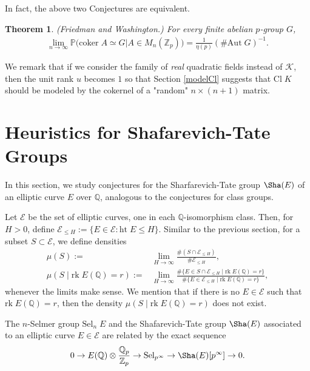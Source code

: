 \documentclass[12pt,reqno]{amsart}
\newtheorem{thm}{Theorem}[section]
\numberwithin{equation}{section}
\def\Z{{\mathbb Z}}
\def\Q{{\mathbb Q}}
\def\P{{\mathbb P}}
\def\sK{{\mathscr K}}
\def\sE{{\mathscr E}}
\begin{document}
In fact, the above two Conjectures are equivalent.

\begin{thm}{\rm (Friedman and Washington.)} For every finite abelian $p$-group $G$,
\begin{align*}
\lim_{n \to \infty} \P\big( \text{coker} \; A \simeq G | A \in M_n(\Z_p)\big) = \frac{1}{\eta(p)} (\# \text{Aut} \; G)^{-1}.
\end{align*}
\end{thm}

We remark that if we consider the family of \textit{real} quadratic fields instead of $\sK$, then the unit rank $u$ becomes $1$ so that Section \ref{modelCl} suggests that $\text{Cl} \; K$ should be modeled by the cokernel of a "random" $n \times (n+1)$ matrix.

\section{Heuristics for Shafarevich-Tate Groups}

In this section, we study conjectures for the Sharfarevich-Tate group $\Sha(E)$ of an elliptic curve $E$ over $\Q$, analogous to the conjectures for class groups.

Let $\sE$ be the set of elliptic curves, one in each $\Q$-isomorphism class. Then, for $H>0$, define $\sE_{\le H}:= \{E \in \sE : \text{ht} \; E \le H \}$. Similar to the previous section, for a subset $S \subset \sE$, we define densities
\begin{align*}
\mu(S):=& \lim_{H \to \infty} \frac{\# (S \cap \sE_{\le H})}{\# \sE_{\le H}},\\
\mu(S \;|\; \text{rk} \; E(\Q) = r):=& \lim_{H \to \infty} \frac{\# \{E \in S \cap \sE_{\le H} \;|\; \text{rk} \; E(\Q) = r \}}{\# \{ E \in \sE_{\le H}\;|\;  \text{rk} \; E(\Q) = r\}},
\end{align*}
whenever the limits make sense. We mention that if there is no $E \in \sE$ such that $\text{rk} \; E(\Q) = r$, then the density $\mu(S \;|\; \text{rk} \; E(\Q) = r)$ does not exist.

The $n$-Selmer group $\text{Sel}_n \; E$ and the Shafarevich-Tate group $\Sha(E)$ associated to an elliptic curve $E \in \sE$ are related by the exact sequence
\begin{align}\label{exact}
0 \rightarrow E(\Q) \otimes \frac{\Q_p}{\Z_p} \rightarrow \text{Sel}_{p^\infty} \rightarrow \Sha(E)[p^\infty] \rightarrow 0.
\end{align}
\end{document}
